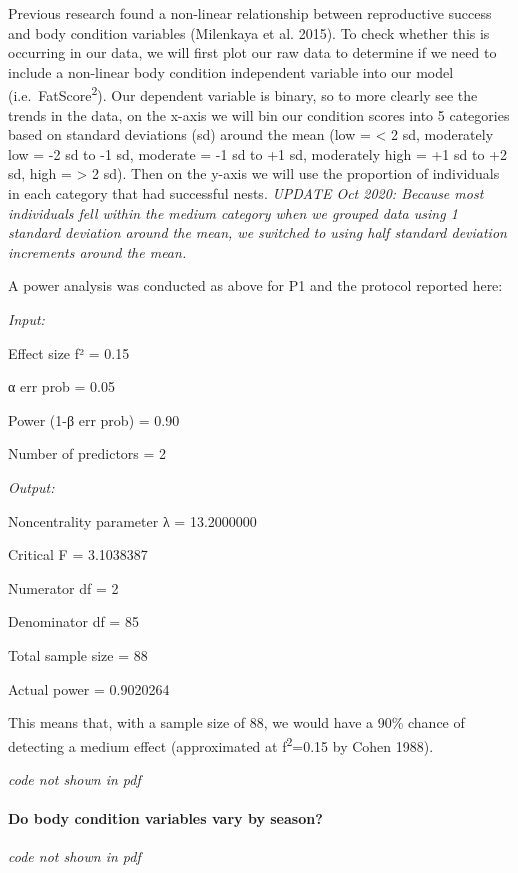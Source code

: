 \documentclass[
]{article}
\begin{document}
Previous research found a non-linear relationship between reproductive
success and body condition variables (Milenkaya et al. 2015). To check
whether this is occurring in our data, we will first plot our raw data
to determine if we need to include a non-linear body condition
independent variable into our model (i.e.~FatScore\textsuperscript{2}).
Our dependent variable is binary, so to more clearly see the trends in
the data, on the x-axis we will bin our condition scores into 5
categories based on standard deviations (sd) around the mean (low =
\textless{} 2 sd, moderately low = -2 sd to -1 sd, moderate = -1 sd to
+1 sd, moderately high = +1 sd to +2 sd, high = \textgreater{} 2 sd).
Then on the y-axis we will use the proportion of individuals in each
category that had successful nests. \emph{UPDATE Oct 2020: Because most
individuals fell within the medium category when we grouped data using 1
standard deviation around the mean, we switched to using half standard
deviation increments around the mean.}

A power analysis was conducted as above for P1 and the protocol reported
here:

\emph{Input:}

Effect size f² = 0.15

α err prob = 0.05

Power (1-β err prob) = 0.90

Number of predictors = 2

\emph{Output:}

Noncentrality parameter λ = 13.2000000

Critical F = 3.1038387

Numerator df = 2

Denominator df = 85

Total sample size = 88

Actual power = 0.9020264

This means that, with a sample size of 88, we would have a 90\% chance
of detecting a medium effect (approximated at f\textsuperscript{2}=0.15
by Cohen 1988).

\emph{code not shown in pdf}

\hypertarget{do-body-condition-variables-vary-by-season}{%
\paragraph{Do body condition variables vary by
season?}\label{do-body-condition-variables-vary-by-season}}

\emph{code not shown in pdf}
\end{document}
